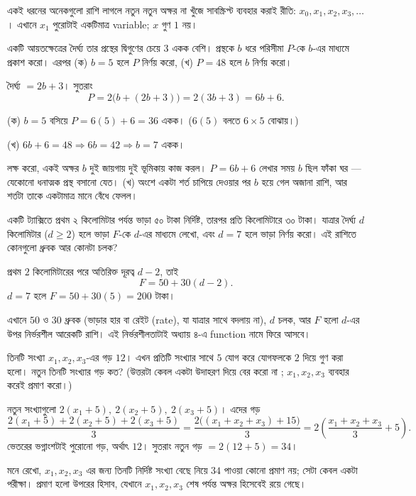 \documentclass[11pt]{article}
\begin{document}
\begin{remark}[সাবস্ক্রিপ্ট]
একই ধরনের অনেকগুলো রাশি লাগলে নতুন নতুন অক্ষর না খুঁজে সাবস্ক্রিপ্ট ব্যবহার করাই
রীতি: $x_0, x_1, x_2, x_3, \dots$। এখানে $x_1$ পুরোটাই একটিমাত্র variable; $x$ গুণ $1$ নয়।
\end{remark}

\begin{example}
একটি আয়তক্ষেত্রের দৈর্ঘ্য তার প্রস্থের দ্বিগুণের চেয়ে $3$ একক বেশি। প্রস্থকে
$b$ ধরে পরিসীমা $P$-কে $b$-এর মাধ্যমে প্রকাশ করো। এরপর (ক) $b = 5$ হলে $P$
নির্ণয় করো, (খ) $P = 48$ হলে $b$ নির্ণয় করো।
\end{example}

\begin{solbox}
দৈর্ঘ্য $= 2b + 3$। সুতরাং
\[
  P = 2\big(b + (2b+3)\big) = 2(3b + 3) = 6b + 6 .
\]

(ক) $b = 5$ বসিয়ে $P = 6(5) + 6 = 36$ একক। ($6(5)$ বলতে $6\times5$ বোঝায়।)

(খ) $6b + 6 = 48 \Rightarrow 6b = 42 \Rightarrow b = 7$ একক।

লক্ষ করো, একই অক্ষর $b$ দুই জায়গায় দুই ভূমিকায় কাজ করল। $P = 6b+6$ লেখার সময়
$b$ ছিল ফাঁকা ঘর --- যেকোনো ধনাত্মক প্রস্থ বসানো যেত। (খ) অংশে একটা শর্ত চাপিয়ে
দেওয়ার পর $b$ হয়ে গেল অজানা রাশি, আর শর্তটা তাকে একটামাত্র মানে বেঁধে ফেলল।
\end{solbox}

 একটি ট্যাক্সিতে প্রথম ২ কিলোমিটার পর্যন্ত ভাড়া ৫০ টাকা নির্দিষ্ট,
তারপর প্রতি কিলোমিটারে ৩০ টাকা। যাত্রার দৈর্ঘ্য $d$ কিলোমিটার ($d \geq 2$) হলে
ভাড়া $F$-কে $d$-এর মাধ্যমে লেখো, এবং $d = 7$ হলে ভাড়া নির্ণয় করো। এই রাশিতে
কোনগুলো ধ্রুবক আর কোনটা চলক?

\begin{sol}
প্রথম $2$ কিলোমিটারের পরে অতিরিক্ত দূরত্ব $d - 2$, তাই
\[
  F = 50 + 30(d - 2) .
\]
$d = 7$ হলে $F = 50 + 30(5) = 200$ টাকা।

\noindent এখানে $50$ ও $30$ ধ্রুবক (ভাড়ার হার বা রেইট (rate), যা যাত্রার সাথে বদলায় না), $d$ চলক, আর $F$
হলো $d$-এর উপর নির্ভরশীল আরেকটি রাশি। এই নির্ভরশীলতাটাই অধ্যায় ৪-এ function
নামে ফিরে আসবে।
\end{sol}

 তিনটি সংখ্যা $x_1, x_2, x_3$-এর গড় $12$। এখন প্রতিটি সংখ্যার সাথে $5$ যোগ করে যোগফলকে $2$ দিয়ে গুণ করা হলো। নতুন তিনটি সংখ্যার গড় কত? (উত্তরটা কেবল একটা উদাহরণ দিয়ে বের করো না ; $x_1, x_2, x_3$ ব্যবহার করেই প্রমাণ করো।)

\begin{sol}
নতুন সংখ্যাগুলো $2(x_1 + 5),\ 2(x_2+5),\ 2(x_3+5)$। এদের গড়
\[
  \frac{2(x_1+5) + 2(x_2+5) + 2(x_3+5)}{3}
  = \frac{2\big((x_1+x_2+x_3) + 15\big)}{3}
  = 2\left( \frac{x_1+x_2+x_3}{3} + 5 \right).
\]
ভেতরের ভগ্নাংশটাই পুরোনো গড়, অর্থাৎ $12$। সুতরাং নতুন গড় $= 2(12 + 5) = 34$।

\noindent মনে রেখো, $x_1, x_2, x_3$ এর জন্য তিনটি নির্দিষ্ট সংখ্যা বেছে নিয়ে $34$ পাওয়া কোনো প্রমাণ নয়; সেটা
কেবল একটা পরীক্ষা। প্রমাণ হলো উপরের হিসাব, যেখানে $x_1, x_2, x_3$ শেষ পর্যন্ত
অক্ষর হিসেবেই রয়ে গেছে।
\end{sol}
\end{document}
